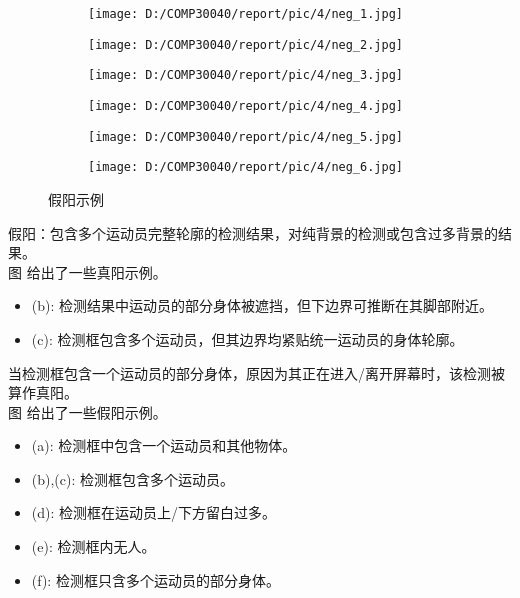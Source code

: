 \documentclass{article}
\begin{document}
\begin{figure}[h!]
\centering
  \begin{subfigure}[b]{0.25\linewidth}
  \centering
    \texttt{[image: D:/COMP30040/report/pic/4/neg\_1.jpg]} 
    \caption{}
  \end{subfigure}
  \begin{subfigure}[b]{0.25\linewidth}
  \centering
    \texttt{[image: D:/COMP30040/report/pic/4/neg\_2.jpg]} 
    \caption{}
  \end{subfigure}
  \begin{subfigure}[b]{0.25\linewidth}
  \centering
    \texttt{[image: D:/COMP30040/report/pic/4/neg\_3.jpg]}
    \caption{} 
  \end{subfigure}
  \begin{subfigure}[b]{0.25\linewidth}
  \centering
    \texttt{[image: D:/COMP30040/report/pic/4/neg\_4.jpg]} 
    \caption{}
  \end{subfigure}
  \begin{subfigure}[b]{0.25\linewidth}
  \centering
    \texttt{[image: D:/COMP30040/report/pic/4/neg\_5.jpg]} 
    \caption{}
  \end{subfigure}
  \begin{subfigure}[b]{0.25\linewidth}
  \centering
    \texttt{[image: D:/COMP30040/report/pic/4/neg\_6.jpg]} 
    \caption{}
  \end{subfigure}
  \caption{假阳示例}
\end{figure}
假阳：包含多个运动员完整轮廓的检测结果，对纯背景的检测或包含过多背景的结果。\\
图 给出了一些真阳示例。
\begin{itemize}
\item (b): 检测结果中运动员的部分身体被遮挡，但下边界可推断在其脚部附近。
\item (c): 检测框包含多个运动员，但其边界均紧贴统一运动员的身体轮廓。
\end{itemize}
当检测框包含一个运动员的部分身体，原因为其正在进入/离开屏幕时，该检测被算作真阳。\\
图 给出了一些假阳示例。
\begin{itemize}
\item (a): 检测框中包含一个运动员和其他物体。
\item (b),(c): 检测框包含多个运动员。 
\item (d): 检测框在运动员上/下方留白过多。
\item (e): 检测框内无人。
\item (f): 检测框只含多个运动员的部分身体。
\end{itemize}
\end{document}
